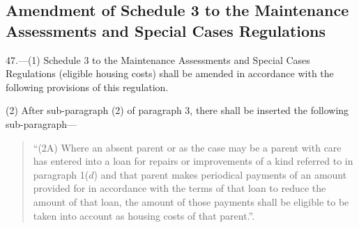 \documentclass[a4paper]{article}
\begin{document}
\subsection[47. Amendment of Schedule 3 to the Maintenance Assessments and Special Cases Regulations]{Amendment of Schedule 3 to the Maintenance Assessments and Special Cases Regulations}

47.—(1) Schedule 3 to the Maintenance Assessments and Special Cases Regulations (eligible housing costs) shall be amended in accordance with the following provisions of this regulation.

(2) After sub-paragraph (2) of paragraph 3, there shall be inserted the following sub-paragraph—
\begin{quotation}
“(2A) Where an absent parent or as the case may be a parent with care has entered into a loan for repairs or improvements of a kind referred to in paragraph 1($d$) and that parent makes periodical payments of an amount provided for in accordance with the terms of that loan to reduce the amount of that loan, the amount of those payments shall be eligible to be taken into account as housing costs of that parent.”.
\end{quotation}
\end{document}
